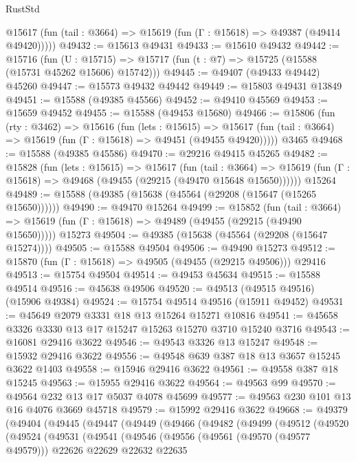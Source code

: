 \begin{lexlean}{RustStd}
\begin{coremodule}
      @15617 (fun (tail : @3664) => @15619 (fun (Γ : @15618) => @49387 (@49414 @49420)))))
@49432 := @15613 @49431
@49433 := @15610 @49432
@49442 := @15716
    (fun (U : @15715) => @15717 (fun (t : @7) => @15725 (@15588 (@15731 @45262 @15606) @15742)))
@49445 := @49407 (@49433 @49442) @45260
@49447 := @15573 @49432 @49442
@49449 := @15803 @49431 @13849
@49451 := @15588 (@49385 @45566)
@49452 := @49410 @45569
@49453 := @15659 @49452
@49455 := @15588 (@49453 @15680)
@49466 := @15806
    (fun (rty : @3462) =>
    @15616
      (fun (lets : @15615) =>
      @15617 (fun (tail : @3664) => @15619 (fun (Γ : @15618) => @49451 (@49455 @49420)))))
    @3465
@49468 := @15588 (@49385 @45586)
@49470 := @29216 @49415 @45265
@49482 := @15828
    (fun (lets : @15615) =>
    @15617
      (fun (tail : @3664) =>
      @15619 (fun (Γ : @15618) => @49468 (@49455 (@29215 (@49470 @15648 @15650))))))
    @15264
@49489 := @15588 (@49385 (@15638 (@45564 (@29208 (@15647 (@15265 @15650))))))
@49490 := @49470 @15264
@49499 := @15852
    (fun (tail : @3664) => @15619 (fun (Γ : @15618) => @49489 (@49455 (@29215 (@49490 @15650)))))
    @15273
@49504 := @49385 (@15638 (@45564 (@29208 (@15647 @15274))))
@49505 := @15588 @49504
@49506 := @49490 @15273
@49512 := @15870 (fun (Γ : @15618) => @49505 (@49455 (@29215 @49506))) @29416
@49513 := @15754 @49504
@49514 := @49453 @45634
@49515 := @15588 @49514
@49516 := @45638 @49506
@49520 := @49513 (@49515 @49516) (@15906 @49384)
@49524 := @15754 @49514 @49516 (@15911 @49452)
@49531 := @45649 @2079 @3331 @18 @13 @15264 @15271 @10816
@49541 := @45658 @3326 @3330 @13 @17 @15247 @15263 @15270 @3710 @15240 @3716
@49543 := @16081 @29416 @3622
@49546 := @49543 @3326 @13 @15247
@49548 := @15932 @29416 @3622
@49556 := @49548 @639 @387 @18 @13 @3657 @15245 @3622 @1403
@49558 := @15946 @29416 @3622
@49561 := @49558 @387 @18 @15245
@49563 := @15955 @29416 @3622
@49564 := @49563 @99
@49570 := @49564 @232 @13 @17 @5037 @4078 @45699
@49577 := @49563 @230 @101 @13 @16 @4076 @3669 @45718
@49579 := @15992 @29416 @3622
@49668 := @49379
    (@49404
      (@49445
        (@49447
          (@49449
            (@49466
              (@49482
                (@49499
                  (@49512
                    (@49520
                      (@49524
                        (@49531
                          (@49541
                            (@49546
                              (@49556
                                (@49561 (@49570 (@49577 @49579)))
                                @22626
                                @22629
                                @22632
                                @22635

\end{coremodule}
\end{lexlean}
